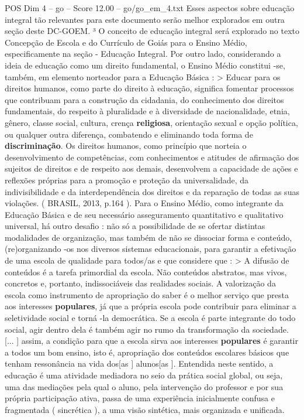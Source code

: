 \begin{textsample}{POS Dim 4 – go – Score 12.00 – go/go\_em\_4.txt}
Esses aspectos sobre educação integral tão relevantes para este documento serão melhor explorados em outra seção deste DC-GOEM. ³ O conceito de educação integral será explorado no texto Concepção de Escola e do Currículo de Goiás para o Ensino Médio, especificamente na seção - Educação Integral.
Por outro lado, considerando a ideia de educação como um direito fundamental, o Ensino Médio constitui -se, também, em elemento norteador para a Educação Básica : > Educar para os direitos humanos, como parte do direito à educação, significa fomentar processos que contribuam para a construção da cidadania, do conhecimento dos direitos fundamentais, do respeito à pluralidade e à diversidade de nacionalidade, etnia, gênero, classe social, cultura, crença \textbf{religiosa}, orientação sexual e opção política, ou qualquer outra diferença, combatendo e eliminando toda forma de \textbf{discriminação}.
Os direitos humanos, como princípio que norteia o desenvolvimento de competências, com conhecimentos e atitudes de afirmação dos sujeitos de direitos e de respeito aos demais, desenvolvem a capacidade de ações e reflexões próprias para a promoção e proteção da universalidade, da indivisibilidade e da interdependência dos direitos e da reparação de todas as suas violações. ( BRASIL, 2013, p.164 ).
Para o Ensino Médio, como integrante da Educação Básica e de seu necessário asseguramento quantitativo e qualitativo universal, há outro desafio : não só a possibilidade de se ofertar distintas modalidades de organização, mas também de não se dissociar forma e conteúdo, (re)organizando -os nos diversos sistemas educacionais, para garantir a efetivação de uma escola de qualidade para todos/as e que considere que : > A difusão de conteúdos é a tarefa primordial da escola.
Não conteúdos abstratos, mas vivos, concretos e, portanto, indissociáveis das realidades sociais.
A valorização da escola como instrumento de apropriação do saber é o melhor serviço que presta aos interesses \textbf{populares}, já que a própria escola pode contribuir para eliminar a seletividade social e torná -la democrática.
Se a escola é parte integrante do todo social, agir dentro dela é também agir no rumo da transformação da sociedade. [... ] assim, a condição para que a escola sirva aos interesses \textbf{populares} é garantir a todos um bom ensino, isto é, apropriação dos conteúdos escolares básicos que tenham ressonância na vida dos[as ] alunos[as ].
Entendida neste sentido, a educação é uma atividade mediadora no seio da prática social global, ou seja, uma das mediações pela qual o aluno, pela intervenção do professor e por sua própria participação ativa, passa de uma experiência inicialmente confusa e fragmentada ( sincrética ), a uma visão sintética, mais organizada e unificada.

\end{textsample}
